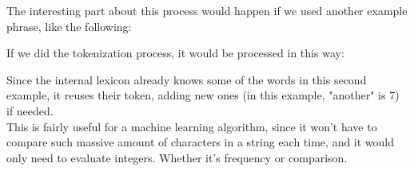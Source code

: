 The interesting part about this process would happen if we used another example phrase, like the following:
\begin{center}
\end{center}

If we did the tokenization process, it would be processed in this way:
\begin{center}
\end{center}

Since the internal lexicon already knows some of the words in this second example, it reuses their token, adding new ones (in this example, "another" is 7) if needed.\\

This is fairly useful for a machine learning algorithm, since it won't have to compare such massive amount of characters in a string each time, and it would only need to evaluate integers. Whether it's frequency or comparison.

\clearpage